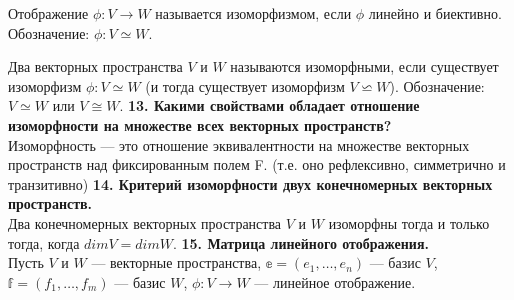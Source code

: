 \documentclass{article}
\begin{document}
Отображение $\phi: V \rightarrow W$ называется изоморфизмом, если $\phi$ линейно и биективно. Обозначение: $\phi : V \simeq  W$.

Два векторных пространства $V$ и $W$ называются изоморфными, если существует изоморфизм $\phi: V \simeq W$ (и тогда существует изоморфизм $V \backsimeq W$). Обозначение: $V \simeq W$ или $V \cong W$.
\newline
\newline
\textbf{13. Какими свойствами обладает отношение изоморфности на множестве всех векторных пространств?}\\
Изоморфность --- это отношение эквивалентности на множестве векторных пространств над фиксированным полем F. (т.е. оно рефлексивно, симметрично и транзитивно)
\newline
\newline
\textbf{14. Критерий изоморфности двух конечномерных векторных пространств.}\\
Два конечномерных векторных пространства $V$ и $W$ изоморфны тогда и только тогда, когда $dim V = dim W$.
\newline
\newline
\textbf{15. Матрица линейного отображения.}\\
Пусть $V$ и $W$ --- векторные пространства, $\mathbb{e} = (e_1, \ldots, e_n)$ --- базис $V$, $\mathbb{f} = (f_1, \ldots, f_m)$ --- базис $W$, $\phi: V \rightarrow W$ --- линейное отображение.
\end{document}
